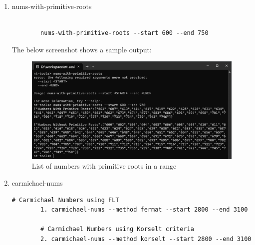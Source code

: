 \documentclass{article}
\begin{document}
\begin{enumerate}
        \item nums-with-primitive-roots
        \begin{lstlisting}[style=DOS]

        nums-with-primitive-roots --start 600 --end 750
        \end{lstlisting}

        The below screenshot shows a sample output:
        \begin{figure}[H]
            \centering
            \includegraphics[scale=0.4]{nums-with-primitive-roots_list.png}
            \caption{List of numbers with primitive roots in a range}
        \end{figure}

        \item carmichael-nums
        \begin{lstlisting}[style=DOS]
        # Carmichael Numbers using FLT
        1. carmichael-nums --method fermat --start 2800 --end 3100

        # Carmichael Numbers using Korselt criteria
        2. carmichael-nums --method korselt --start 2800 --end 3100
        \end{lstlisting}


\end{enumerate}
\end{document}
